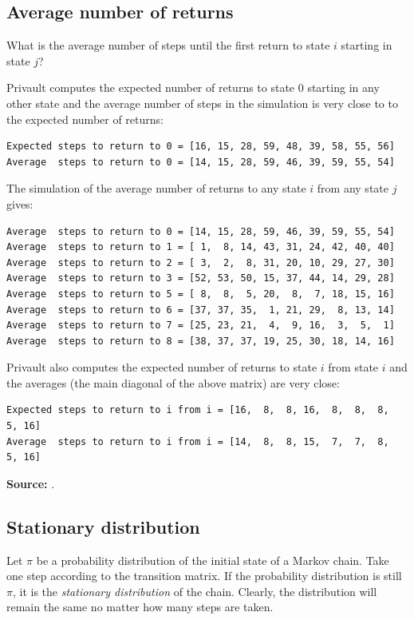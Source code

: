 \documentclass[11pt,a4paper]{article}
\begin{document}
\subsection{Average number of returns}
What is the average number of steps until the first return to state $i$ starting in state $j$?

Privault \cite[Sections~5.3]{privault} computes the expected number of returns to state $0$ starting in any other state and the average number of steps in the simulation is very close to to the expected number of returns:
\begin{verbatim}
Expected steps to return to 0 = [16, 15, 28, 59, 48, 39, 58, 55, 56]
Average  steps to return to 0 = [14, 15, 28, 59, 46, 39, 59, 55, 54]
\end{verbatim}
The simulation of the average number of returns to any state $i$ from any state $j$ gives:
\begin{verbatim}
Average  steps to return to 0 = [14, 15, 28, 59, 46, 39, 59, 55, 54]
Average  steps to return to 1 = [ 1,  8, 14, 43, 31, 24, 42, 40, 40]
Average  steps to return to 2 = [ 3,  2,  8, 31, 20, 10, 29, 27, 30]
Average  steps to return to 3 = [52, 53, 50, 15, 37, 44, 14, 29, 28]
Average  steps to return to 5 = [ 8,  8,  5, 20,  8,  7, 18, 15, 16]
Average  steps to return to 6 = [37, 37, 35,  1, 21, 29,  8, 13, 14]
Average  steps to return to 7 = [25, 23, 21,  4,  9, 16,  3,  5,  1]
Average  steps to return to 8 = [38, 37, 37, 19, 25, 30, 18, 14, 16]
\end{verbatim}
Privault \cite[Sections~7.2]{privault} also computes the expected number of returns to state $i$ from state $i$ and the averages (the main diagonal of the above matrix) are very close:
\begin{verbatim}
Expected steps to return to i from i = [16,  8,  8, 16,  8,  8,  8,  5, 16]
Average  steps to return to i from i = [14,  8,  8, 15,  7,  7,  8,  5, 16]
\end{verbatim}

\textbf{Source:} \cite[Section 5.3]{privault}.


\subsection{Stationary distribution}\label{stationary}

Let $\pi$ be a probability distribution of the initial state of a Markov chain. Take one step according to the transition matrix. If the probability distribution is still $\pi$, it is the \emph{stationary distribution} of the chain. Clearly, the distribution will remain the same no matter how many steps are taken.
\end{document}
